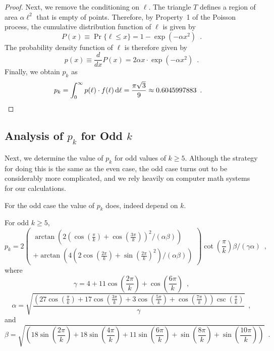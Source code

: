 \documentclass{patmorin}
\begin{document}
\begin{proof}
  Next, we remove the conditioning on $\ell$.  The triangle $T$ defines a
  region of area $\alpha\ell^2$ that is empty of points.  Therefore,
  by Property~1 of the Poisson process, the cumulative distribution
  function of $\ell$ is given by
  \[
    P(x) \equiv \Pr\{\ell \le x\} = 1-\exp(-\alpha x^2) \enspace .
  \]
  The probability density function of $\ell$ is therefore given by 
  \[
     p(x) \equiv \frac{d}{dx}P(x) =
     2\alpha x\cdot\exp(-\alpha x^2) \enspace .
  \]
  Finally, we obtain $p_k$ as 
  \begin{align*}
     p_k = \int_0^\infty p(\ell)\cdot f(\ell)\,\mathrm{d}\ell 
     = \frac{\pi\sqrt{3}}{9}
      \approx 0.6045997883  \enspace . & \qedhere
  \end{align*}
\end{proof}


\subsection{Analysis of $p_k$ for Odd $k$}

Next, we determine the value of $p_k$ for odd values of
$k\ge 5$.  Although the strategy for doing this is the same as the even
case, the odd case turns out to be considerably more complicated, and
we rely heavily on computer math systems for our calculations.

For the odd case the value of $p_k$ does, indeed depend on $k$.

\begin{lem}
  For odd $k\ge 5$,
\[
p_k = 
2
\left(\begin{array}{l}
  \arctan\left(
     2\left(\cos\left(\frac{\pi }{k}\right)
       +\cos\left(\frac{3 \pi }{k}\right)\right)^2 / (\alpha\beta) 
  \right) \\
   + \arctan\left(
       4 \left(2 \cos\left(\frac{2 \pi }{k}\right)
       +\sin\left(\frac{2 \pi }{k}\right)^2\right)/(\alpha\beta) 
     \right)
  \end{array}
\right)
\cot\left(\frac{\pi }{k}\right) 
\beta
/
\left(\gamma \alpha\right)\enspace ,
\]
where
\[
\gamma =4+11 \cos\left(\frac{2 \pi }{k}\right)+\cos\left(\frac{6 \pi }{k}\right) \enspace ,
\]
\[
\alpha = 
\sqrt{\frac{\left(27 \cos\left(\frac{\pi }{k}\right)+17 \cos\left(\frac{3 \pi }{k}\right)+3 \cos\left(\frac{5 \pi }{k}\right)+\cos\left(\frac{7 \pi }{k}\right)\right) \csc\left(\frac{\pi }{k}\right)}{\gamma}} \enspace ,
\]
and
\[
\beta = \sqrt{\left(18 \sin\left(\frac{2 \pi }{k}\right)+18 \sin\left(\frac{4 \pi }{k}\right)+11 \sin\left(\frac{6 \pi }{k}\right)+\sin\left(\frac{8 \pi }{k}\right)+\sin\left(\frac{10 \pi }{k}\right)\right)} \enspace .
\]
\end{lem}
\end{document}
